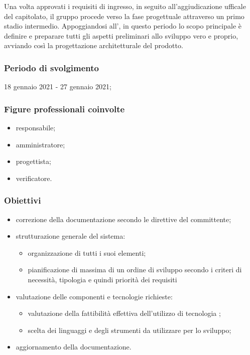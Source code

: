 Una volta approvati i requisiti di ingresso, in seguito all'aggiudicazione ufficale del capitolato, il gruppo procede verso la fase progettuale attraverso un primo stadio intermedio. Appoggiandosi all'\AdR{}, in questo periodo lo scopo principale è definire e preparare tutti gli aspetti preliminari allo sviluppo vero e proprio, avviando così la progettazione architetturale del prodotto.
        
        \subsubsection{Periodo di svolgimento}
        18 gennaio 2021 - 27 gennaio 2021;
        
        \subsubsection{Figure professionali coinvolte}
            \begin{itemize}
                \item responsabile;
                \item amministratore;
                \item progettista;
                \item verificatore.
            \end{itemize}

        \subsubsection{Obiettivi}
        \begin{itemize}
            \item correzione della documentazione secondo le direttive del committente;
            \item strutturazione generale del sistema:
            \begin{itemize}
                \item organizzazione di tutti i suoi elementi;
                \item pianificazione di massima di un ordine di sviluppo secondo i criteri di necessità, tipologia e quindi priorità dei requisiti
            \end{itemize}
            \item valutazione delle componenti e tecnologie richieste:
            \begin{itemize}
                \item valutazione della fattibilità effettiva dell'utilizzo di tecnologia ;
                \item scelta dei linguaggi e degli strumenti da utilizzare per lo sviluppo;
            \end{itemize}
            \item aggiornamento della documentazione.
        \end{itemize}